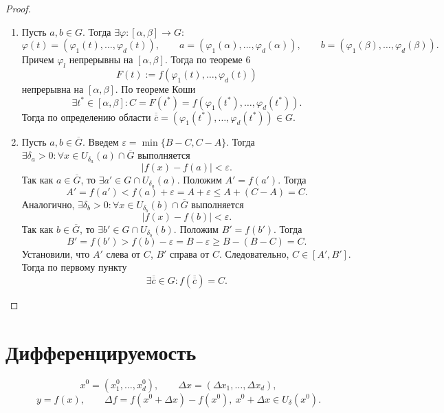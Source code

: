 \documentclass[12pt,a4paper]{report}
\begin{document}
\begin{proof}
    \begin{enumerate}
        \item Пусть $a,b\in G$. Тогда $\exists \varphi\colon[\alpha,\beta]\to G$:
        \[
        \varphi(t)=(\varphi_1(t),\dots,\varphi_d(t)),\qquad a=(\varphi_1(\alpha),\dots,\varphi_d(\alpha)),\qquad b=(\varphi_1(\beta),\dots,\varphi_d(\beta)).
        \]
        Причем $\varphi_l$ непрерывны на $[\alpha,\beta]$. Тогда по теореме 6
        \[
        F(t):=f(\varphi_1(t),\dots,\varphi_d(t))
        \]
        непрерывна на $[\alpha,\beta]$. По теореме Коши
        \[
        \exists t^*\in[\alpha,\beta]\colon C=F(t^*)=f(\varphi_1(t^*),\dots,\varphi_d(t^*)).
        \]
        Тогда по определению области $\overline{\overline{c}}=(\varphi_1(t^*),\dots,\varphi_d(t^*))\in G$.

        \item Пусть $a,b\in\overline G$. Введем $\varepsilon=\min\{B-C,C-A\}$. Тогда $\exists \delta_a>0\colon \forall x\in U_{\delta_a}(a)\cap\overline G$ выполняется
        \[
        |f(x)-f(a)|<\varepsilon.
        \]
        Так как $a\in\overline G$, то $\exists a'\in G\cap U_{\delta_a}(a)$. Положим $A'=f(a')$. Тогда
        \[
        A'=f(a')<f(a)+\varepsilon=A+\varepsilon\leq A+(C-A)=C.
        \]
        Аналогично, $\exists \delta_b>0\colon \forall x\in U_{\delta_b}(b)\cap\overline G$ выполняется
        \[
        |f(x)-f(b)|<\varepsilon.
        \]
        Так как $b\in\overline G$, то $\exists b'\in G\cap U_{\delta_b}(b)$. Положим $B'=f(b')$. Тогда
        \[
        B'=f(b')>f(b)-\varepsilon=B-\varepsilon\geq B-(B-C)=C.
        \]
        Установили, что $A'$ слева от $C$, $B'$ справа от $C$. Следовательно, $C\in[A',B']$. Тогда по первому пункту
        \[
        \exists \overline{\overline{c}}\in G\colon f(\overline{\overline{c}})=C.
        \]
    \end{enumerate}
\end{proof}

\section{Дифференцируемость}
\[
x^0=(x_1^0,\dots,x_d^0),\qquad \Delta x=(\Delta x_1,\dots ,\Delta x_d),
\]
\[
y=f(x),\qquad \Delta f=f(x^0+\Delta x)-f(x^0), \ x^0+\Delta x\in U_\delta(x^0).
\]

\end{document}
